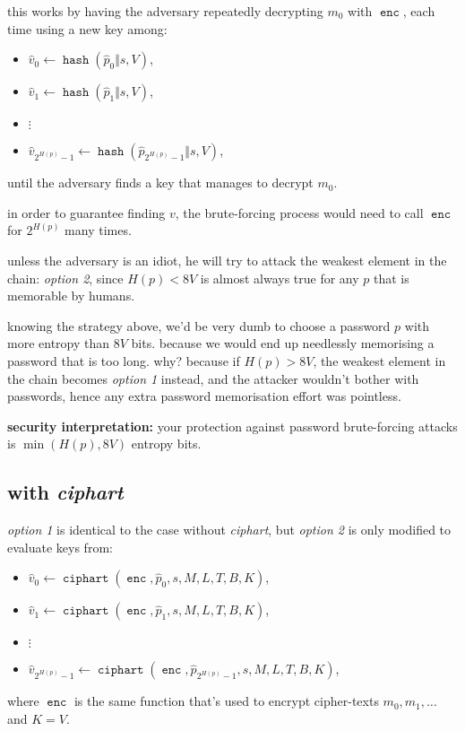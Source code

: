 \documentclass[twocolumn]{article}
\DeclareMathOperator{\enc}{\texttt{enc}}
\DeclareMathOperator{\hash}{\texttt{hash}}
\DeclareMathOperator{\kdf}{\texttt{ciphart}}
\begin{document}
\begin{itemize}
    this works by having the adversary repeatedly decrypting $m_0$ with
    $\enc$, each time using a new key among:
    \begin{itemize}
        \item $\hat v_0 \gets \hash(\hat p_0 \Vert s, V)$,
        \item $\hat v_1 \gets \hash(\hat p_1 \Vert s, V)$,
        \item $\vdots$
        \item $\hat v_{2^{H(p)}-1} \gets \hash(\hat p_{2^{H(p)}-1} \Vert s,
        V)$,
    \end{itemize}
    until the adversary finds a key that manages to decrypt $m_0$.

    in order to guarantee finding $v$, the brute-forcing process would need
    to call $\enc$ for $2^{H(p)}$ many times.
\end{itemize}

unless the adversary is an idiot, he will try to attack the weakest element
in the chain: \emph{option 2}, since $H(p) < 8V$ is almost always true for
any $p$ that is memorable by humans.

knowing the strategy above, we'd be very dumb to choose a password $p$ with
more entropy than $8V$ bits.  because we would end up needlessly memorising
a password that is too long.  why?  because if $H(p) > 8V$, the weakest
element in the chain becomes \emph{option 1} instead, and the attacker
wouldn't bother with passwords, hence any extra password memorisation
effort was pointless.

\textbf{security interpretation:}  your protection against password
brute-forcing attacks is $\min(H(p), 8V)$ entropy bits.

\subsection{with \emph{ciphart}}
\emph{option 1} is identical to the case without \emph{ciphart}, but
\emph{option 2} is only modified to evaluate keys from:
\begin{itemize}
    \item $\hat v_0 \gets \kdf(\enc, \hat p_0, s, M, L, T, B, K)$,
    \item $\hat v_1 \gets \kdf(\enc, \hat p_1, s, M, L, T, B, K)$,
    \item $\vdots$
    \item $\hat v_{2^{H(p)}-1} \gets \kdf(\enc, \hat p_{2^{H(p)}-1}, s, M,
    L, T, B, K)$,
\end{itemize}
where $\enc$ is the same function that's used to encrypt cipher-texts $m_0,
m_1, \ldots$ and $K = V$.
\end{document}

